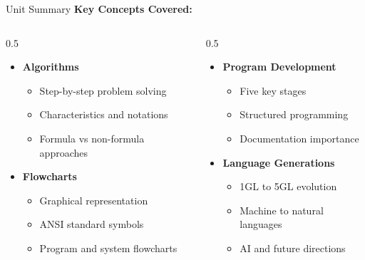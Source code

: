 \documentclass[aspectratio=169]{beamer}
\begin{document}
\begin{frame}{Unit Summary}
    \textbf{Key Concepts Covered:}
    
    \begin{columns}
        \begin{column}{0.5\textwidth}
            \begin{itemize}
                \item[\faIcon{check-circle}] \textbf{Algorithms}
                \begin{itemize}
                    \item Step-by-step problem solving
                    \item Characteristics and notations
                    \item Formula vs non-formula approaches
                \end{itemize}
                
                \item[\faIcon{check-circle}] \textbf{Flowcharts}
                \begin{itemize}
                    \item Graphical representation
                    \item ANSI standard symbols
                    \item Program and system flowcharts
                \end{itemize}
            \end{itemize}
        \end{column}
        \begin{column}{0.5\textwidth}
            \begin{itemize}
                \item[\faIcon{check-circle}] \textbf{Program Development}
                \begin{itemize}
                    \item Five key stages
                    \item Structured programming
                    \item Documentation importance
                \end{itemize}
                
                \item[\faIcon{check-circle}] \textbf{Language Generations}
                \begin{itemize}
                    \item 1GL to 5GL evolution
                    \item Machine to natural languages
                    \item AI and future directions
                \end{itemize}
            \end{itemize}
        \end{column}
    \end{columns}
    

\end{frame}
\end{document}
